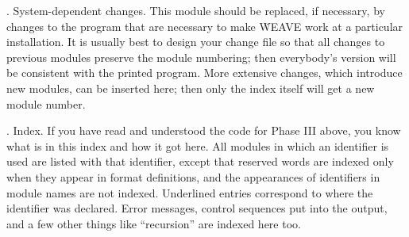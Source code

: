 .  System-dependent changes.
This module should be replaced, if necessary, by changes to the program
that are necessary to make \.{WEAVE} work at a particular installation.
It is usually best to design your change file so that all changes to
previous modules preserve the module numbering; then everybody's version
will be consistent with the printed program. More extensive changes,
which introduce new modules, can be inserted here; then only the index
itself will get a new module number.

\fi

\*.  Index.
If you have read and understood the code for Phase III above, you know what
is in this index and how it got here. All modules in which an identifier is
used are listed with that identifier, except that reserved words are
indexed only when they appear in format definitions, and the appearances
of identifiers in module names are not indexed. Underlined entries
correspond to where the identifier was declared. Error messages, control
sequences put into the output, and a few
other things like ``recursion'' are indexed here too.
\fi


